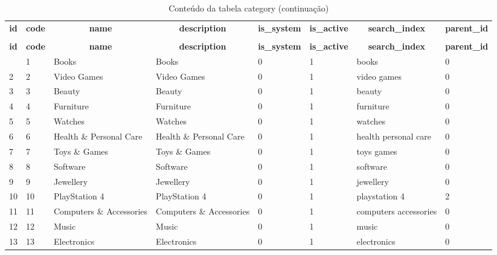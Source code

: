 %
%
 \begin{longtable}{|l|l|l|l|l|l|l|l|} 
 \hline \endhead \hline \endfoot \hline 
 \caption{Conteúdo da tabela category} \label{tab:category-data} \\\hline \multicolumn{1}{|c|}{\textbf{id}} & \multicolumn{1}{|c|}{\textbf{code}} & \multicolumn{1}{|c|}{\textbf{name}} & \multicolumn{1}{|c|}{\textbf{description}} & \multicolumn{1}{|c|}{\textbf{is\_system}} & \multicolumn{1}{|c|}{\textbf{is\_active}} & \multicolumn{1}{|c|}{\textbf{search\_index}} & \multicolumn{1}{|c|}{\textbf{parent\_id}} \\ \hline \hline  \endfirsthead 
\caption{Conteúdo da tabela category (continuação)} \\ \hline \multicolumn{1}{|c|}{\textbf{id}} & \multicolumn{1}{|c|}{\textbf{code}} & \multicolumn{1}{|c|}{\textbf{name}} & \multicolumn{1}{|c|}{\textbf{description}} & \multicolumn{1}{|c|}{\textbf{is\_system}} & \multicolumn{1}{|c|}{\textbf{is\_active}} & \multicolumn{1}{|c|}{\textbf{search\_index}} & \multicolumn{1}{|c|}{\textbf{parent\_id}} \\ \hline \hline \endhead \endfoot
1 & 1 & Books & Books & 0 & 1 & books & 0 \\ \hline 
2 & 2 & Video Games & Video Games & 0 & 1 & video games & 0 \\ \hline 
3 & 3 & Beauty & Beauty & 0 & 1 & beauty & 0 \\ \hline 
4 & 4 & Furniture & Furniture & 0 & 1 & furniture & 0 \\ \hline 
5 & 5 & Watches & Watches & 0 & 1 & watches & 0 \\ \hline 
6 & 6 & Health \& Personal Care & Health \& Personal Care & 0 & 1 & health personal care & 0 \\ \hline 
7 & 7 & Toys \& Games & Toys \& Games & 0 & 1 & toys games & 0 \\ \hline 
8 & 8 & Software & Software & 0 & 1 & software & 0 \\ \hline 
9 & 9 & Jewellery & Jewellery & 0 & 1 & jewellery & 0 \\ \hline 
10 & 10 & PlayStation 4 & PlayStation 4 & 0 & 1 & playstation 4 & 2 \\ \hline 
11 & 11 & Computers \& Accessories & Computers \& Accessories & 0 & 1 & computers accessories & 0 \\ \hline 
12 & 12 & Music & Music & 0 & 1 & music & 0 \\ \hline 
13 & 13 & Electronics & Electronics & 0 & 1 & electronics & 0 \\ \hline 

\end{longtable}
